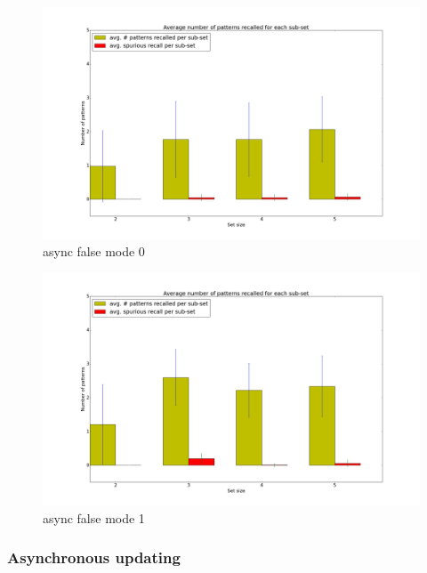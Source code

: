 \begin{figure}[h!]
    \centering
    \includegraphics[width=13cm]{fig/async_false_mode_0.png}
    \caption{async false mode 0}
    \label{fig:async_false_mode_0}
\end{figure}

\begin{figure}[h!]
    \centering
    \includegraphics[width=13cm]{fig/async_false_mode_1.png}
    \caption{async false mode 1}
    \label{fig:async_false_mode_1}
\end{figure}

\subsubsection{Asynchronous updating}

